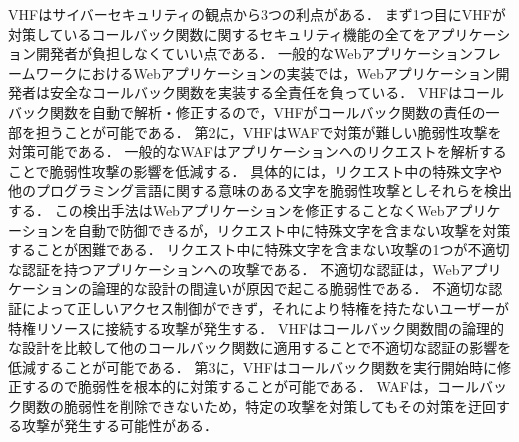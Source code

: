 \documentclass[a4paper,12pt]{jreport}
\begin{document}
VHFはサイバーセキュリティの観点から3つの利点がある．
まず1つ目にVHFが対策しているコールバック関数に関するセキュリティ機能の全てをアプリケーション開発者が負担しなくていい点である．
一般的なWebアプリケーションフレームワークにおけるWebアプリケーションの実装では，Webアプリケーション開発者は安全なコールバック関数を実装する全責任を負っている．
VHFはコールバック関数を自動で解析・修正するので，VHFがコールバック関数の責任の一部を担うことが可能である．
第2に，VHFはWAFで対策が難しい脆弱性攻撃を対策可能である．
一般的なWAFはアプリケーションへのリクエストを解析することで脆弱性攻撃の影響を低減する．
具体的には，リクエスト中の特殊文字や他のプログラミング言語に関する意味のある文字を脆弱性攻撃としそれらを検出する．
この検出手法はWebアプリケーションを修正することなくWebアプリケーションを自動で防御できるが，リクエスト中に特殊文字を含まない攻撃を対策することが困難である．
リクエスト中に特殊文字を含まない攻撃の1つが不適切な認証を持つアプリケーションへの攻撃である．
不適切な認証は，Webアプリケーションの論理的な設計の間違いが原因で起こる脆弱性である．
不適切な認証によって正しいアクセス制御ができず，それにより特権を持たないユーザーが特権リソースに接続する攻撃が発生する．
VHFはコールバック関数間の論理的な設計を比較して他のコールバック関数に適用することで不適切な認証の影響を低減することが可能である．
第3に，VHFはコールバック関数を実行開始時に修正するので脆弱性を根本的に対策することが可能である．
WAFは，コールバック関数の脆弱性を削除できないため，特定の攻撃を対策してもその対策を迂回する攻撃が発生する可能性がある．
\end{document}
